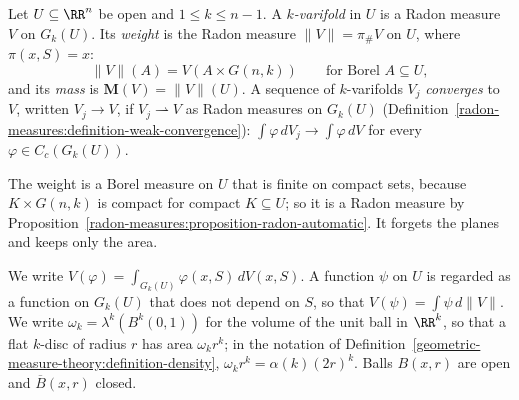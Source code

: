 \begin{definition}\label{varifolds:definition-varifold}
Let $U \subseteq \RR^n$ be open and $1 \leq k \leq n - 1$. A \emph{$k$-varifold} in $U$ is a Radon measure $V$ on $G_k(U)$. Its \emph{weight} is the Radon measure $\|V\| = \pi_\#V$ on $U$, where
$\pi(x, S) = x$:
\[
\|V\|(A) = V(A \times G(n, k)) \qquad \text{for Borel } A \subseteq U,
\]
and its \emph{mass} is $\mathbf{M}(V) = \|V\|(U)$. A sequence of $k$-varifolds $V_j$ \emph{converges} to $V$, written $V_j \to V$, if $V_j \rightharpoonup V$ as Radon measures on $G_k(U)$
(Definition~\ref{radon-measures:definition-weak-convergence}): $\int\varphi\,dV_j \to \int\varphi\,dV$ for every $\varphi \in C_c(G_k(U))$.
\end{definition}

The weight is a Borel measure on $U$ that is finite on compact sets, because $K \times G(n, k)$ is compact for compact $K \subseteq U$; so it is a Radon measure by
Proposition~\ref{radon-measures:proposition-radon-automatic}. It forgets the planes and keeps only the area.

\begin{notation}\label{varifolds:notation-varifolds}
We write $V(\varphi) = \int_{G_k(U)}\varphi(x, S)\,dV(x, S)$. A function $\psi$ on $U$ is regarded as a function on $G_k(U)$ that does not depend on $S$, so that $V(\psi) = \int\psi\,d\|V\|$. We write
$\omega_k = \lambda^k(B^k(0, 1))$ for the volume of the unit ball in $\RR^k$, so that a flat $k$-disc of radius $r$ has area $\omega_kr^k$; in the notation of
Definition~\ref{geometric-measure-theory:definition-density}, $\omega_kr^k = \alpha(k)(2r)^k$. Balls $B(x, r)$ are open and $\overline{B}(x, r)$ closed.
\end{notation}


